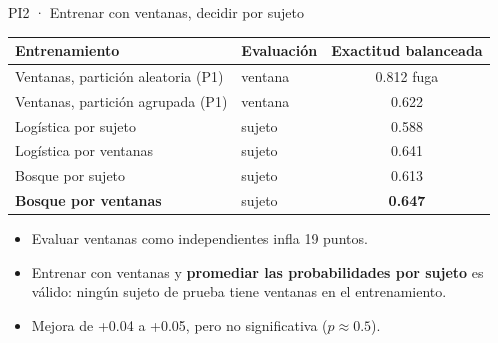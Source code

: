 \documentclass[aspectratio=169,10pt]{beamer}
\begin{document}
\begin{frame}{PI2 · Entrenar con ventanas, decidir por sujeto}
  \centering
  \begin{tabular}{llc}
    \toprule
    Entrenamiento & Evaluación & Exactitud balanceada \\
    \midrule
    Ventanas, partición aleatoria (P1) & ventana & 0.812 \quad \textcolor{als}{fuga} \\
    Ventanas, partición agrupada (P1) & ventana & 0.622 \\
    \midrule
    Logística por sujeto & sujeto & 0.588 \\
    Logística por ventanas & sujeto & 0.641 \\
    Bosque por sujeto & sujeto & 0.613 \\
    \textbf{Bosque por ventanas} & sujeto & \textbf{0.647} \\
    \bottomrule
  \end{tabular}

  \vspace{1em}
  \raggedright
  \begin{itemize}
    \item Evaluar ventanas como independientes infla 19 puntos.
    \item Entrenar con ventanas y \textbf{promediar las probabilidades por sujeto} es válido: ningún sujeto de prueba tiene ventanas en el entrenamiento.
    \item Mejora de +0.04 a +0.05, pero no significativa ($p \approx 0.5$).
  \end{itemize}
\end{frame}
\end{document}
